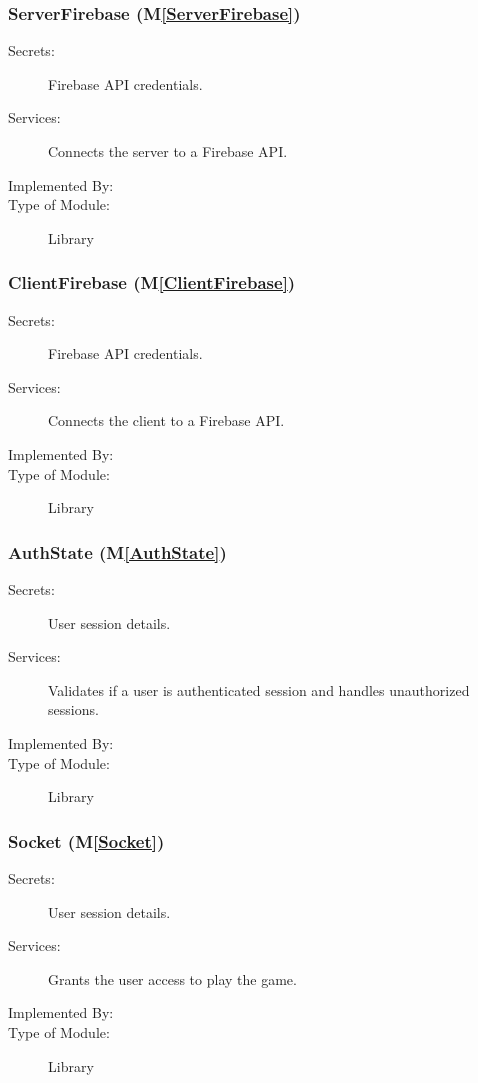 \documentclass[12pt, titlepage]{article}
\newcommand{\mref}[1]{M\ref{#1}}
\begin{document}
\subsubsection{ServerFirebase (\mref{ServerFirebase})}

\begin{description}
\item[Secrets:] Firebase API credentials.
\item[Services:] Connects the server to a Firebase API.
\item[Implemented By:]  \progname
\item[Type of Module:] Library
\end{description}

\subsubsection{ClientFirebase (\mref{ClientFirebase})}

\begin{description}
\item[Secrets:] Firebase API credentials.
\item[Services:] Connects the client to a Firebase API.
\item[Implemented By:]  \progname
\item[Type of Module:] Library
\end{description}


\subsubsection{AuthState (\mref{AuthState})}

\begin{description}
\item[Secrets:] User session details.
\item[Services:] Validates if a user is authenticated session and handles unauthorized sessions.
\item[Implemented By:]  \progname
\item[Type of Module:] Library
\end{description}

\subsubsection{Socket (\mref{Socket})}

\begin{description}
\item[Secrets:] User session details.
\item[Services:] Grants the user access to play the game.
\item[Implemented By:]  \progname
\item[Type of Module:] Library
\end{description}
\end{document}
